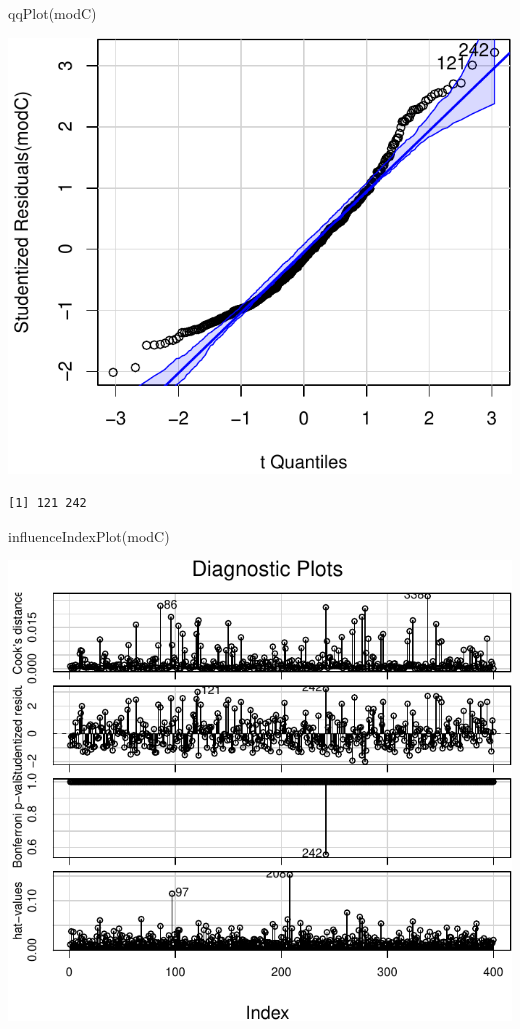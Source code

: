 \documentclass[
]{article}
\newenvironment{Shaded}{\begin{snugshade}}{\end{snugshade}}
\newcommand{\FunctionTok}[1]{\textcolor[rgb]{0.00,0.00,0.00}{#1}}
\newcommand{\NormalTok}[1]{#1}
\begin{document}
\begin{Shaded}
\begin{Highlighting}[]
\FunctionTok{qqPlot}\NormalTok{(modC)}
\end{Highlighting}
\end{Shaded}

\begin{center}\includegraphics{SDM-CHAP24_files/figure-latex/DPcar-2} \end{center}

\begin{verbatim}
[1] 121 242
\end{verbatim}

\begin{Shaded}
\begin{Highlighting}[]
\FunctionTok{influenceIndexPlot}\NormalTok{(modC)}
\end{Highlighting}
\end{Shaded}

\begin{center}\includegraphics{SDM-CHAP24_files/figure-latex/DPcar-3} \end{center}
\end{document}

